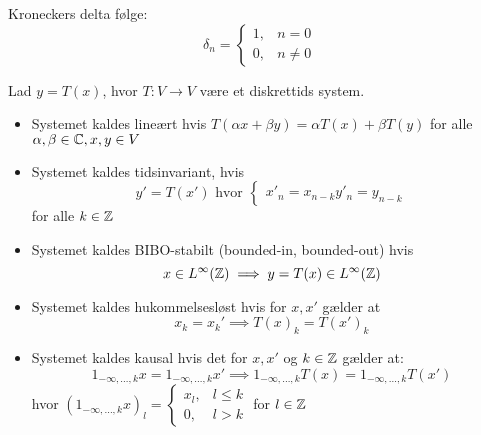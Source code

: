 \begin{definition}
  Kroneckers delta følge:
  \begin{equation*}
    \delta_{n} = \begin{cases} 1, & n = 0 \\ 0, & n \neq 0 \end{cases}
  \end{equation*}
\end{definition}

\begin{definition}
  Lad $y = T(x)$, hvor $T: V \to V$ være et diskrettids system.
  \begin{itemize}
    \item Systemet kaldes lineært hvis $T(\alpha x + \beta y) = \alpha T(x) + \beta T(y)$ for alle $\alpha, \beta \in \mathbb{C}, x, y \in V$
    \item Systemet kaldes tidsinvariant, hvis
      \begin{equation*}
        y' = T(x') \text{ hvor } \begin{cases}
                                   x'_{n}= x_{n - k}
                                   y'_{n}= y_{n - k}
                                 \end{cases}
      \end{equation*}
      for alle $k \in \mathbb{Z}$
    \item Systemet kaldes BIBO-stabilt (bounded-in, bounded-out) hvis
      \begin{equation*}
        x \in L^{\infty}(\mathbb{Z}) \implies y = T(x) \in L^{\infty}(\mathbb{Z})
      \end{equation*}
    \item Systemet kaldes hukommelsesløst hvis for $x, x'$ gælder at
      \begin{equation*}
        x_{k} = x_{k}' \implies T(x)_{k} = T(x')_{k}
      \end{equation*}
    \item Systemet kaldes kausal hvis det for $x, x'$ og $k \in \mathbb{Z}$ gælder at:
        \begin{equation*}
          1_{-\infty, \ldots, k}x = 1_{-\infty, \ldots, k}x' \implies 1_{-\infty, \ldots, k}T(x) = 1_{-\infty, \ldots, k}T(x')
        \end{equation*}
      hvor $(1_{-\infty, \ldots, k}x)_{l} = \begin{cases}
                                              x_{l}, & l\leq k\\
                                              0, & l > k
                                            \end{cases}$
      for $l \in \mathbb{Z}$
  \end{itemize}
\end{definition}

